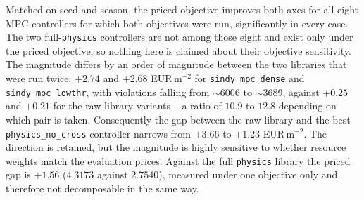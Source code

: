 Matched on seed and season, the priced objective improves both axes for all eight MPC
controllers for which both objectives were run, significantly in every case. The two
full-\texttt{physics} controllers are not among those eight and exist only under the priced
objective, so nothing here is claimed about their objective sensitivity. The magnitude differs
by an order of magnitude between the two libraries that were run twice: $+2.74$ and $+2.68$
EUR\,m$^{-2}$ for \texttt{sindy\_mpc\_dense} and \texttt{sindy\_mpc\_lowthr}, with
violations falling from $\sim$6006 to $\sim$3689, against $+0.25$ and $+0.21$ for the
raw-library variants -- a ratio of $10.9$ to $12.8$ depending on which pair is taken.
Consequently the gap between the raw library and the best
\texttt{physics\_no\_cross} controller narrows from $+3.66$ to $+1.23$ EUR\,m$^{-2}$.
The direction is retained, but the magnitude is highly sensitive to whether resource
weights match the evaluation prices. Against the full
\texttt{physics} library the priced gap is $+1.56$ ($4.3173$ against $2.7540$), measured
under one objective only and therefore not decomposable in the same way.

